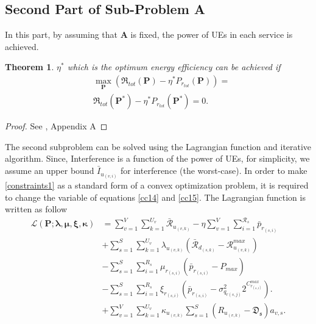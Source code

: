 \documentclass[conference]{IEEEtran}
\newtheorem{theorem}{Theorem}
\begin{document}
\subsection{Second Part of Sub-Problem A}\label{secondsub}
In this part, by assuming that $\boldsymbol{A}$ is fixed, the power of UEs in each service is achieved.
\begin{theorem}\label{t2}
 $\eta^*$ which is the optimum energy efficiency can be achieved if
\begin{equation}\label{q2}
\begin{split}
&\max \limits_{\boldsymbol{P}} (\mathfrak{R}_{tot}(\boldsymbol{P}) - \eta^* P_{r_{tot}}(\boldsymbol{P}))=\\
& \mathfrak{R}_{tot}(\boldsymbol{P}^*) - \eta^* P_{r_{tot}}(\boldsymbol{P}^*) =0.
\end{split}
\end{equation}
\end{theorem}
\begin{proof}
See \cite{aaa}, Appendix A
\end{proof}
The second subproblem can  be solved using the Lagrangian function and iterative algorithm. 
Since, Interference is a function of the power of UEs, for simplicity, we assume an upper bound $\bar{I}_{u_{(v,i)}}$ for interference (the worst-case). 
In order to make \eqref{constraints1} as a standard form of a convex optimization problem, it is required to change the variable of equations \eqref{cc14} and \eqref{cc15}.
The Lagrangian function is written as follow
\begin{equation}\label{lagrang}
\begin{split}
\mathcal{L}(\boldsymbol{P}; \boldsymbol{\lambda}, \boldsymbol{\mu}, \boldsymbol{ \xi}, \boldsymbol{ \kappa}) & = \sum\limits_{v=1}^{V} \sum\limits_{k=1}^{U_v}\mathcal{\bar{R}}_{u_{(v,k)}} 
- \eta \sum\limits_{v=1}^{V} \sum\limits_{i=1}^{\mathcal{R}_s}\bar{p}_{r_{(s,i)}}\\
&+\sum\limits_{s=1}^{S} \sum\limits_{k=1}^{U_v} \lambda_{u_{(v,k)}} (\mathcal{\bar{R}}_{d_{(s,k)}}-\mathcal{R}_{u_{(v,k)}}^{max})\\
&- \sum\limits_{s=1}^{S} \sum\limits_{i=1}^{R_s} \mu_{r_{(s,i)}} (\bar{p}_{r_{(s,i)}}-P_{max})\\
&- \sum\limits_{s=1}^{S} \sum\limits_{i=1}^{R_s} \xi_{r_{(s,i)}} (\bar{p}_{r_{(s,i)}}-\sigma_{q_{r(s,j)}}^2 2^{C_{r_{(s,i)}}^{max}}).\\ 
&+ \sum\limits_{v=1}^{V} \sum\limits_{k=1}^{U_v} \kappa_{u_{(v,k)}} \sum\limits_{s=1}^{S}(R_{u_{(v,k)}} -\mathfrak{D_s})a_{v,s}.\\ 
\end{split}
\end{equation}
\end{document}
